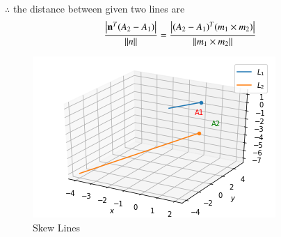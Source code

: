 \documentclass[journal,12pt,twocolumn]{IEEEtran}
\begin{document}
\\
$\therefore$ the distance between given two lines are
\begin{align}
\frac{\left\vert\mathbf{n}^T(A_2-A_1)\right\vert}{\left\lVert n\right\rVert} = \frac{\left\vert(A_2-A_1)^T(m_1 \times m_2)\right\vert}{\left\lVert m_1 \times m_2\right\rVert}
\end{align}
\begin{figure}[!ht]
\centering
\includegraphics[width=\columnwidth]{download (7).png}
\caption{Skew Lines}
\label{fig: Skew Lines}	
\end{figure}
\end{document}
